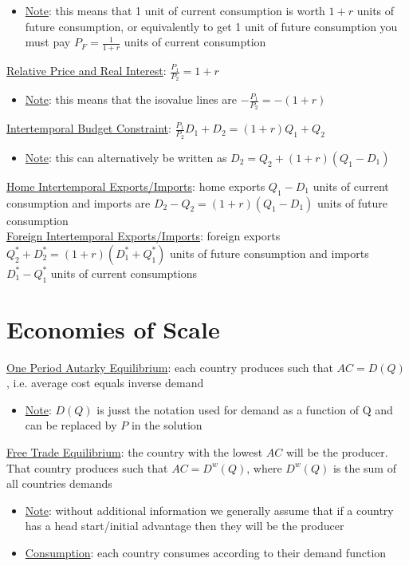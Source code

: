 \documentclass{article}
\begin{document}
\begin{itemize}
  \item  \underline{Note}: this means that 1 unit of current consumption is worth $1 + r$ units of future consumption, or equivalently to get 1 unit of future consumption you must pay $P_{F} = \tfrac{1}{1+r}$ units of current consumption
\end{itemize}
\underline{Relative Price and Real Interest}: $\tfrac{P_{1}}{P_{2}} = 1 + r$
\begin{itemize}
  \item  \underline{Note}: this means that the isovalue lines are $-\tfrac{P_{1}}{P_{2}} = -(1+r)$
\end{itemize}
\underline{Intertemporal Budget Constraint}: $\frac{P_{1}}{P_{2}}D_{1} + D_{2} = (1+r)Q_{1} + Q_{2}$
\begin{itemize}
  \item  \underline{Note}: this can alternatively be written as $D_{2} = Q_{2} + (1+r)(Q_{1} - D_{1})$
\end{itemize}
\underline{Home Intertemporal Exports/Imports}: home exports $Q_{1} - D_{1}$ units of current consumption and imports are $D_{2} - Q_{2} = (1+r)(Q_{1} - D_{1})$ units of future consumption \\
\underline{Foreign Intertemporal Exports/Imports}: foreign exports $Q_{2}^{*}+D_{2}^{*} = (1+r)(D_{1}^{*} + Q_{1}^{*})$ units of future consumption and imports $D_{1}^{*}  - Q_{1}^{*}$ units of current consumptions

\newpage

\section{Economies of Scale}
\underline{One Period Autarky Equilibrium}: each country produces such that $AC = D(Q)$, i.e. average cost equals inverse demand \\
\begin{itemize}
  \item  \underline{Note}: $D(Q)$ is jusst the notation used for demand as a function of Q and can be replaced by $P$ in the solution
\end{itemize}
\underline{Free Trade Equilibrium}: the country with the lowest $AC$ will be the producer. That country produces such that $AC = D^{w}(Q)$, where $D^{w}(Q)$ is the sum of all countries demands
\begin{itemize}
  \item  \underline{Note}: without additional information we generally assume that if a country has a head start/initial advantage then they will be the producer
  \item  \underline{Consumption}: each country consumes according to their demand function
\end{itemize}
\end{document}
